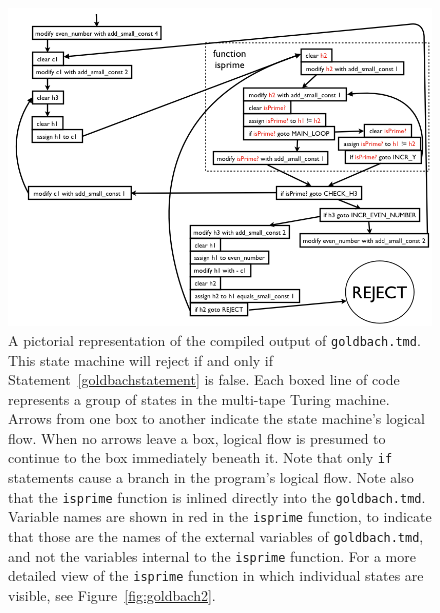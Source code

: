 \documentclass[11pt]{report}
\begin{document}
\begin{figure} 
\begin{center} 
\includegraphics[scale=0.4]{figs/goldbach1.png} 
\caption{A pictorial representation of the compiled output of \texttt{goldbach.tmd}. This state machine will reject if and only if Statement~\ref{goldbachstatement} is false. Each boxed line of code represents a group of states in the multi-tape Turing machine. Arrows from one box to another indicate the state machine's logical flow. When no arrows leave a box, logical flow is presumed to continue to the box immediately beneath it. Note that only \texttt{if} statements cause a branch in the program's logical flow. Note also that the \texttt{isprime} function is inlined directly into the \texttt{goldbach.tmd}. Variable names are shown in red in the \texttt{isprime} function, to indicate that those are the names of the external variables of \texttt{goldbach.tmd}, and not the variables internal to the \texttt{isprime} function. For a more detailed view of the \texttt{isprime} function in which individual states are visible, see Figure~\ref{fig:goldbach2}. \label{fig:goldbach1}}
\end{center} 
\end{figure}
\end{document}
